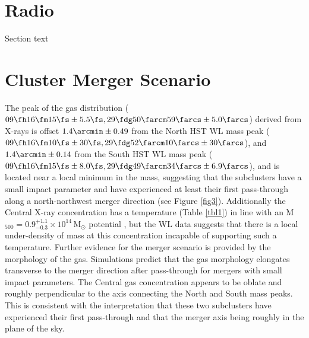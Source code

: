 \section{Radio}

Section text

\section{Cluster Merger Scenario}

The peak of the gas distribution ($09\fh16\fm15\fs\pm5.5\fs, 29\fdg50\farcm59\farcs\pm5.0\farcs$) derived from X-rays is offset $1.4\arcmin\pm0.49$ from the North HST WL mass peak ($09\fh16\fm10\fs\pm30\fs, 29\fdg52\farcm10\farcs\pm30\farcs$), and $1.4\arcmin\pm0.14$ from the South HST WL mass peak ($09\fh16\fm15\fs\pm8.0\fs, 29\fdg49\farcm34\farcs\pm6.9\farcs$), and is located near a local minimum in the mass, suggesting that the subclusters have a small impact parameter and have experienced at least their first pass-through along a north-northwest merger direction (see Figure \ref{fig3}).
Additionally the Central X-ray concentration has a temperature (Table \ref{tbl1}) in line with an M$_{500}=0.9^{+1.1}_{-0.3}\times10^{14}$\,M$_{\odot}$ potential \citep{vikh09}, but the WL data suggests that there is a local under-density of mass at this concentration incapable of supporting such a temperature.
Further evidence for the merger scenario is provided by the morphology of the gas.
Simulations \citep{schi93,pool06} predict that the gas morphology elongates transverse to the merger direction after pass-through for mergers with small impact parameters.
The Central gas concentration appears to be oblate and roughly perpendicular to the axis connecting the North and South mass peaks.
This is consistent with the interpretation that these two subclusters have experienced their first pass-through and that the merger axis being roughly in the plane of the sky.

